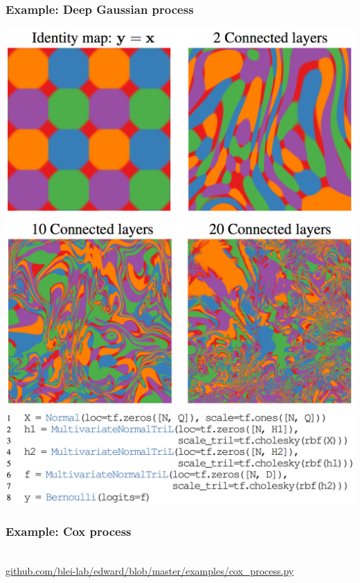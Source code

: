 \documentclass[10pt,
               xcolor={usenames,dvipsnames},
               hyperref={colorlinks,linktoc=all,citecolor=Plum,linkcolor=MidnightBlue,urlcolor=MidnightBlue},noamssymb]{beamer}
\begin{document}
\begin{frame}[plain]
\frametitle{Example: Deep Gaussian process}
\begin{center}
\includegraphics[height=0.27\textwidth]{img/deep-gp-0.png}
\includegraphics[height=0.27\textwidth]{img/deep-gp-1.png}
\\[2.5ex]
\includegraphics[height=0.22\textwidth]{img/deep-gp-code.png}
\end{center}
\end{frame}

\begin{frame}
\frametitle{Example: Cox process}
\vspace{10ex}
\begin{center}
\gray{\Large [Demo]} \\[3ex]
{\large \url{github.com/blei-lab/edward/blob/master/examples/cox_process.py}}
\end{center}
\end{frame}
\end{document}
